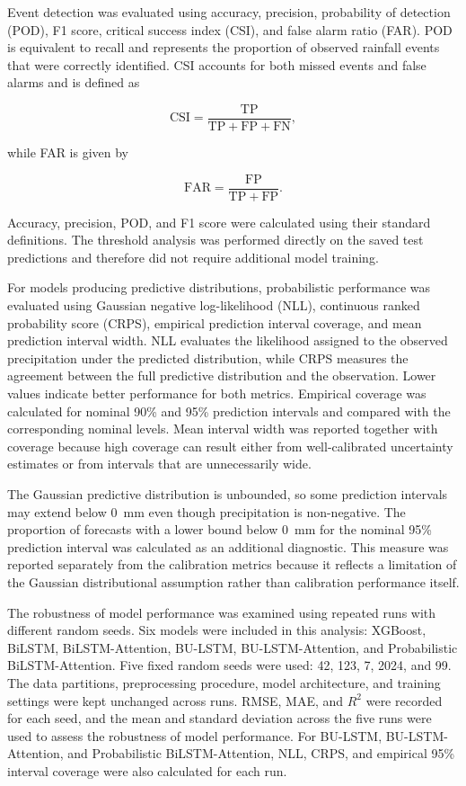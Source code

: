 \documentclass[referee,pdflatex,sn-basic]{sn-jnl}%
\theoremstyle{thmstyleone}%
\theoremstyle{thmstyletwo}%
\theoremstyle{thmstylethree}%
\begin{document}
Event detection was evaluated using accuracy, precision, probability of detection (POD), F1 score, critical success index (CSI), and false alarm ratio (FAR). POD is equivalent to recall and represents the proportion of observed rainfall events that were correctly identified. CSI accounts for both missed events and false alarms and is defined as

\begin{equation}
\mathrm{CSI}
=
\frac{\mathrm{TP}}
{\mathrm{TP}+\mathrm{FP}+\mathrm{FN}},
\label{eq:csi}
\end{equation}

while FAR is given by

\begin{equation}
\mathrm{FAR}
=
\frac{\mathrm{FP}}
{\mathrm{TP}+\mathrm{FP}}.
\label{eq:far}
\end{equation}

Accuracy, precision, POD, and F1 score were calculated using their standard definitions. The threshold analysis was performed directly on the saved test predictions and therefore did not require additional model training.

For models producing predictive distributions, probabilistic performance was evaluated using Gaussian negative log-likelihood (NLL), continuous ranked probability score (CRPS), empirical prediction interval coverage, and mean prediction interval width. NLL evaluates the likelihood assigned to the observed precipitation under the predicted distribution, while CRPS measures the agreement between the full predictive distribution and the observation. Lower values indicate better performance for both metrics. Empirical coverage was calculated for nominal 90\% and 95\% prediction intervals and compared with the corresponding nominal levels. Mean interval width was reported together with coverage because high coverage can result either from well-calibrated uncertainty estimates or from intervals that are unnecessarily wide.

The Gaussian predictive distribution is unbounded, so some prediction intervals may extend below 0~mm even though precipitation is non-negative. The proportion of forecasts with a lower bound below 0~mm for the nominal 95\% prediction interval was calculated as an additional diagnostic. This measure was reported separately from the calibration metrics because it reflects a limitation of the Gaussian distributional assumption rather than calibration performance itself.

The robustness of model performance was examined using repeated runs with different random seeds. Six models were included in this analysis: XGBoost, BiLSTM, BiLSTM-Attention, BU-LSTM, BU-LSTM-Attention, and Probabilistic BiLSTM-Attention. Five fixed random seeds were used: 42, 123, 7, 2024, and 99. The data partitions, preprocessing procedure, model architecture, and training settings were kept unchanged across runs. RMSE, MAE, and $R^2$ were recorded for each seed, and the mean and standard deviation across the five runs were used to assess the robustness of model performance. For BU-LSTM, BU-LSTM-Attention, and Probabilistic BiLSTM-Attention, NLL, CRPS, and empirical 95\% interval coverage were also calculated for each run.
\end{document}
